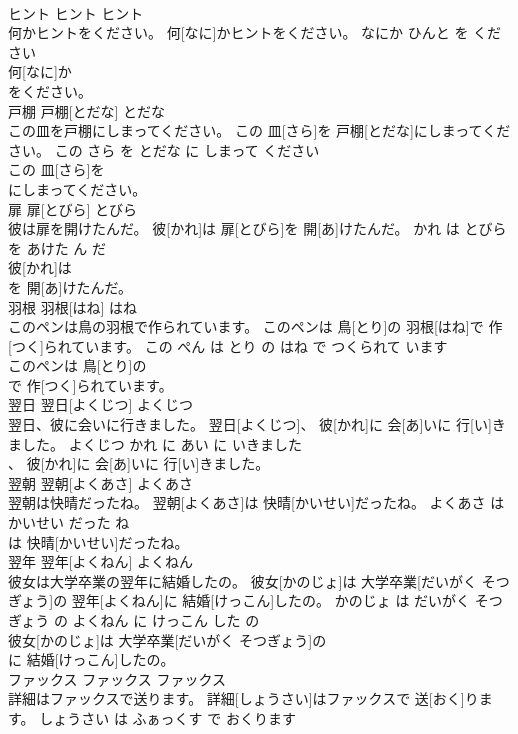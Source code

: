 \documentclass[8pt]{extreport}
\begin{document}
\begin{CJK}{UTF8}{min}
\\	ヒント	ヒント	ヒント	
\\	何かヒントをください。	何[なに]かヒントをください。	なにか ひんと を ください	
\\	何[なに]か
\\	をください。			
\\	戸棚	戸棚[とだな]	とだな	
\\	この皿を戸棚にしまってください。	この 皿[さら]を 戸棚[とだな]にしまってください。	この さら を とだな に しまって ください	
\\	この 皿[さら]を
\\	にしまってください。			
\\	扉	扉[とびら]	とびら	
\\	彼は扉を開けたんだ。	彼[かれ]は 扉[とびら]を 開[あ]けたんだ。	かれ は とびら を あけた ん だ	
\\	彼[かれ]は
\\	を 開[あ]けたんだ。			
\\	羽根	羽根[はね]	はね	
\\	このペンは鳥の羽根で作られています。	このペンは 鳥[とり]の 羽根[はね]で 作[つく]られています。	この ぺん は とり の はね で つくられて います	
\\	このペンは 鳥[とり]の
\\	で 作[つく]られています。			
\\	翌日	翌日[よくじつ]	よくじつ	
\\	翌日、彼に会いに行きました。	翌日[よくじつ]、 彼[かれ]に 会[あ]いに 行[い]きました。	よくじつ かれ に あい に いきました	
\\	、 彼[かれ]に 会[あ]いに 行[い]きました。			
\\	翌朝	翌朝[よくあさ]	よくあさ	
\\	翌朝は快晴だったね。	翌朝[よくあさ]は 快晴[かいせい]だったね。	よくあさ は かいせい だった ね	
\\	は 快晴[かいせい]だったね。			
\\	翌年	翌年[よくねん]	よくねん	
\\	彼女は大学卒業の翌年に結婚したの。	彼女[かのじょ]は 大学卒業[だいがく そつぎょう]の 翌年[よくねん]に 結婚[けっこん]したの。	かのじょ は だいがく そつぎょう の よくねん に けっこん した の	
\\	彼女[かのじょ]は 大学卒業[だいがく そつぎょう]の
\\	に 結婚[けっこん]したの。			
\\	ファックス	ファックス	ファックス	
\\	詳細はファックスで送ります。	詳細[しょうさい]はファックスで 送[おく]ります。	しょうさい は ふぁっくす で おくります	

\end{CJK}
\end{document}
